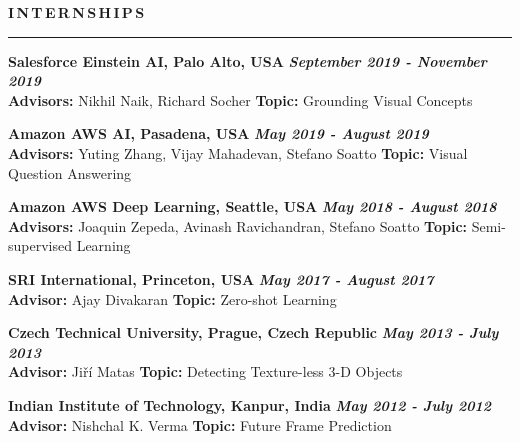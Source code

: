 \documentclass[11pt, a4paper]{article}
\begin{document}
\vspace{10pt}


\textbf{I\,N\,T\,E\,R\,N\,S\,H\,I\,P\,S}
\vspace{5pt}
\hrule
\vspace{8pt}

\textbf{Salesforce Einstein AI, Palo Alto, USA} \hfill \textit{\textbf{September 2019 - November 2019}} \\
\textbf{Advisors: }Nikhil Naik, Richard Socher \hfill \textbf{Topic: }Grounding Visual Concepts

\vspace{4pt}

\textbf{Amazon AWS AI, Pasadena, USA} \hfill \textit{\textbf{May 2019 - August 2019}} \\
\textbf{Advisors: }Yuting Zhang, Vijay Mahadevan, Stefano Soatto \hfill \textbf{Topic: }Visual Question Answering

\vspace{4pt}

\textbf{Amazon AWS Deep Learning, Seattle, USA} \hfill \textit{\textbf{May 2018 - August 2018}} \\
\textbf{Advisors: }Joaquin Zepeda, Avinash Ravichandran, Stefano Soatto \hfill \textbf{Topic: }Semi-supervised Learning

\vspace{4pt}

\textbf{SRI International, Princeton, USA} \hfill \textit{\textbf{May 2017 - August 2017}} \\
\textbf{Advisor: }Ajay Divakaran \hfill \textbf{Topic: }Zero-shot Learning

\vspace{4pt}

\textbf{Czech Technical University, Prague, Czech Republic} \hfill \textit{\textbf{May 2013 - July 2013}} \\
\textbf{Advisor: }Ji\v{r}\'{i} Matas \hfill \textbf{Topic: }Detecting Texture-less 3-D Objects

\vspace{4pt}

\textbf{Indian Institute of Technology, Kanpur, India} \hfill \textit{\textbf{May 2012 - July 2012}} \\
\textbf{Advisor: }Nishchal K. Verma \hfill \textbf{Topic: }Future Frame Prediction
	
\end{document}
